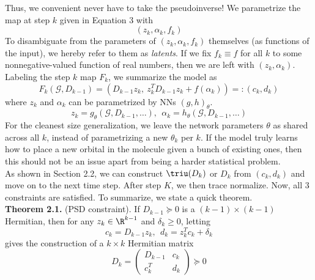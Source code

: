 \documentclass[12pt]{article}
\begin{document}
    Thus, we convenient never have to take the pseudoinverse! We parametrize the map at step $k$ given in Equation 3 with
    \begin{equation}
        (z_k, \alpha_k, f_k)
    \end{equation}
    To disambiguate from the parameters of $(z_k, \alpha_k, f_k)$ themselves (as functions of the input), we hereby refer to them as \textit{latents}. If we fix $f_k \equiv f$ for all $k$ to some nonnegative-valued function of real numbers, then we are left with $(z_k, \alpha_k)$. Labeling the step $k$ map $F_k$, we summarize the model as
    \begin{equation}
        F_k(\mathcal{G}, D_{k-1}) = (D_{k-1} z_k,\  z_k^T D_{k-1} z_k + f(\alpha_k)) =: (c_k, d_k)
    \end{equation}
    where $z_k$ and $\alpha_k$ can be parametrized by NNs $(g, h)_\theta$.
    \begin{equation}
        z_k = g_{\theta}(\mathcal{G}, D_{k-1}, \ldots), \ \ \alpha_k = h_\theta (\mathcal{G}, D_{k-1}, \ldots)
    \end{equation}
    For the cleanest size generalization, we leave the network parameters $\theta$ as shared across all $k$, instead of parametrizing a new $\theta_k$ per $k$. If the model truly learns how to place a new orbital in the molecule given a bunch of existing ones, then this should not be an issue apart from being a harder statistical problem. \\[-6pt]
    
    As shown in Section 2.2, we can construct $\triu(D_k)$ or $D_k$ from $(c_k, d_k)$ and move on to the next time step. After step $K$, we then trace normalize. Now, all 3 constraints are satisfied. To summarize, we state a quick theorem. \\[-6pt]

    \textbf{Theorem 2.1.} (PSD constraint). If $D_{k-1} \succeq 0$ is a $(k-1) \times (k-1)$ Hermitian, then for any $z_k \in \R^{k-1}$ and $\delta_k \geq 0$, letting
    \begin{equation}
        c_k = D_{k-1} z_k, \ \ d_k = z_k^T c_k + \delta_k
    \end{equation}
    gives the construction of a $k \times k$ Hermitian matrix
    \begin{equation}
        D_k = \begin{pmatrix}
            D_{k-1} & c_k \\
            c_k^T & d_k
        \end{pmatrix} \succeq 0
    \end{equation}
\end{document}
